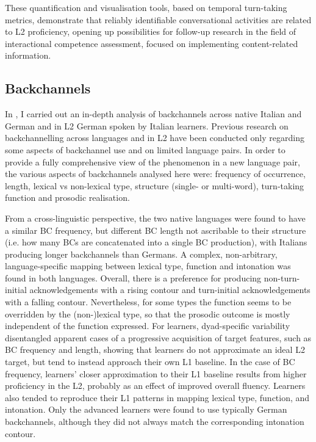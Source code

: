 These quantification and visualisation tools, based on temporal turn-taking metrics, demonstrate that reliably identifiable conversational activities are related to L2 proficiency, opening up possibilities for follow-up research in the field of interactional competence assessment, focused on implementing content-related information.


\subsection{Backchannels}
In , I carried out an in-depth analysis of backchannels across native Italian and German and in L2 German spoken by Italian learners. Previous research on backchannelling across languages and in L2 have been conducted only regarding some aspects of backchannel use and on limited language pairs. In order to provide a fully comprehensive view of the phenomenon in a new language pair, the various aspects of backchannels analysed here were: frequency of occurrence, length, lexical vs non-lexical type, structure (single- or multi-word), turn-taking function and prosodic realisation.

From a cross-linguistic perspective, the two native languages were found to have a similar BC frequency, but different BC length not ascribable to their structure (i.e. how many BCs are concatenated into a single BC production), with Italians producing longer backchannels than Germans. A complex, non-arbitrary, language-specific mapping between lexical type, function and intonation was found in both languages. Overall, there is a preference for producing non-turn-initial acknowledgements with a rising contour and turn-initial acknowledgements with a falling contour. Nevertheless, for some types the function seems to be overridden by the (non-)lexical type, so that the prosodic outcome is mostly independent of the function expressed. For learners, dyad-specific variability disentangled apparent cases of a progressive acquisition of target features, such as BC frequency and length, showing that learners do not approximate an ideal L2 target, but tend to instead approach their own L1 baseline. In the case of BC frequency, learners’ closer approximation to their L1 baseline results from higher proficiency in the L2, probably as an effect of improved overall fluency. Learners also tended to reproduce their L1 patterns in mapping lexical type, function, and intonation. Only the advanced learners were found to use typically German backchannels, although they did not always match the corresponding intonation contour.


